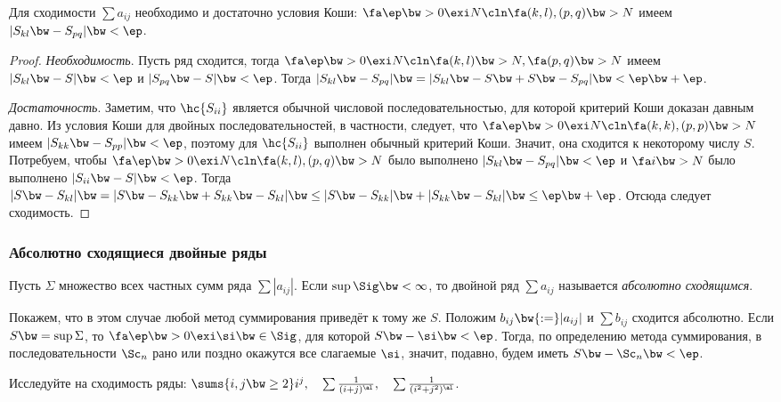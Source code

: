 \documentclass[a4paper]{article}
\begin{document}
\begin{theorem}
Для сходимости $\sum a_{ij}$ необходимо и достаточно условия Коши:
$\fa \ep \bw> 0 \exi N\cln \fa (k, l), (p,q) \bw> N$ имеем $|S_{kl} \bw- S_{pq}| \bw< \ep$.
\end{theorem}
\begin{proof}
\emph{Необходимость}. Пусть ряд сходится, тогда $\fa \ep \bw> 0 \exi N\cln \fa (k,l) \bw> N, \fa (p,q) \bw> N$
имеем $|S_{kl} \bw- S| \bw< \ep$ и $|S_{pq} \bw- S| \bw< \ep$. Тогда
$|S_{kl} \bw- S_{pq}| \bw= |S_{kl} \bw- S \bw+ S \bw- S_{pq}| \bw< \ep \bw+ \ep$.

\emph{Достаточность}. Заметим, что $\hc{S_{ii}}$ является обычной числовой последовательностью,
для которой критерий Коши доказан давным давно. Из условия Коши для двойных последовательностей, в частности,
следует, что $\fa \ep \bw> 0 \exi N\cln \fa (k,k), (p,p) \bw> N$ имеем $|S_{kk} \bw- S_{pp}| \bw< \ep$, поэтому
для $\hc{S_{ii}}$ выполнен обычный критерий Коши. Значит, она сходится к некоторому числу $S$.
Потребуем, чтобы $\fa \ep \bw> 0 \exi N\cln \fa (k,l), (p,q) \bw> N$ было выполнено $|S_{kl} \bw- S_{pq}| \bw< \ep$ и
$\fa i \bw> N$ было выполнено $|S_{ii} \bw- S| \bw< \ep$. Тогда $|S \bw- S_{kl}| \bw=
|S \bw- S_{kk} \bw+ S_{kk} \bw- S_{kl}| \bw\le |S \bw- S_{kk}| \bw+ |S_{kk} \bw- S_{kl}| \bw\le \ep \bw+ \ep$.
Отсюда следует сходимость.
\end{proof}

\subsubsection{Абсолютно сходящиеся двойные ряды}
\begin{df}
Пусть $\Sigma$ множество всех частных сумм ряда $\sum |a_{ij}|$. Если $\sup \Sig \bw< \infty$,
то двойной ряд $\sum a_{ij}$ называется \emph{абсолютно сходящимся}.
\end{df}

Покажем, что в этом случае любой метод суммирования приведёт к тому же $S$. Положим
$b_{ij} \bw{:=} |a_{ij}|$ и $\sum b_{ij}$ сходится
абсолютно. Если $S \bw= \sup \Sigma$, то $\fa \ep \bw> 0 \exi \si \bw\in \Sig$, для
которой $S \bw- \si \bw< \ep$. Тогда, по определению метода суммирования, в последовательности
$\Sc_n$ рано или поздно окажутся все слагаемые $\si$, значит, подавно, будем иметь $S \bw- \Sc_n \bw< \ep$.

\begin{ex}
Исследуйте на сходимость ряды: $\sums{i,j\bw\ge 2} i^j,
\quad \sum \frac1{(i + j)^\al}, \quad \sum \frac1{(i^2 + j^2)^\al}$.
\end{ex}
\end{document}
